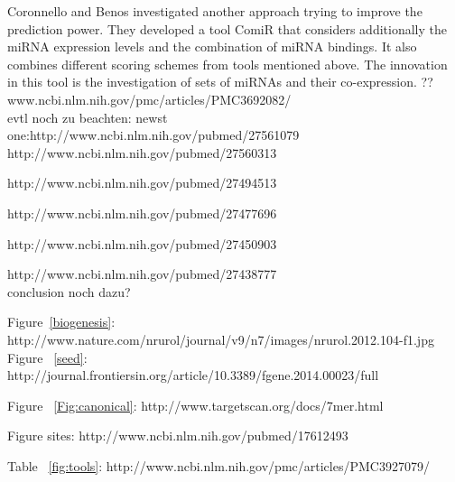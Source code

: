\documentclass[12pt]{article}
\begin{document}
Coronnello and Benos \cite{Coronnello} investigated another approach trying to improve the prediction power. They developed a tool ComiR that considers additionally the miRNA expression levels and the combination of miRNA bindings. It also combines different scoring schemes from tools mentioned above. The innovation in this tool is the investigation of sets of miRNAs and their co-expression. ?? www.ncbi.nlm.nih.gov/pmc/articles/PMC3692082/ \\





evtl noch zu beachten:
newst one:http://www.ncbi.nlm.nih.gov/pubmed/27561079
http://www.ncbi.nlm.nih.gov/pubmed/27560313

http://www.ncbi.nlm.nih.gov/pubmed/27494513
  
http://www.ncbi.nlm.nih.gov/pubmed/27477696

http://www.ncbi.nlm.nih.gov/pubmed/27450903

http://www.ncbi.nlm.nih.gov/pubmed/27438777
\\


conclusion noch dazu?


\newpage



\listoffigures


\listoftables


Figure~\ref{biogenesis}: \cite{Kelly} http://www.nature.com/nrurol/journal/v9/n7/images/nrurol.2012.104-f1.jpg
Figure ~\ref{seed}: http://journal.frontiersin.org/article/10.3389/fgene.2014.00023/full

Figure ~\ref{Fig:canonical}: http://www.targetscan.org/docs/7mer.html

Figure sites: http://www.ncbi.nlm.nih.gov/pubmed/17612493

Table ~\ref{fig:tools}: http://www.ncbi.nlm.nih.gov/pmc/articles/PMC3927079/
\end{document}
